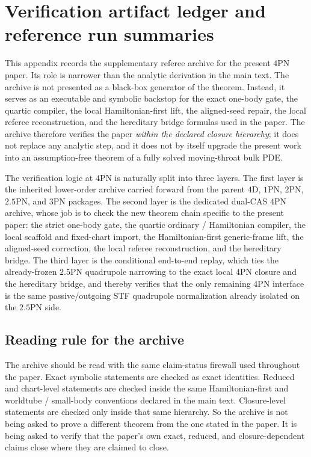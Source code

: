 \documentclass[11pt]{article}
\begin{document}

\section{Verification artifact ledger and reference run summaries}
\label{app:verification-artifact-ledger}

This appendix records the supplementary referee archive for the present $4$PN
paper.  Its role is narrower than the analytic derivation in the main text.  The
archive is not presented as a black-box generator of the theorem.  Instead, it
serves as an executable and symbolic backstop for the exact one-body gate, the
quartic compiler, the local Hamiltonian-first lift, the aligned-seed repair, the
local referee reconstruction, and the hereditary bridge formulas used in the
paper.  The archive therefore verifies the paper \emph{within the declared
closure hierarchy}; it does not replace any analytic step, and it does not by
itself upgrade the present work into an assumption-free theorem of a fully solved
moving-throat bulk PDE.

The verification logic at $4$PN is naturally split into three layers.  The
first layer is the inherited lower-order archive carried forward from the parent
$4$D, $1$PN, $2$PN, $2.5$PN, and $3$PN packages.  The second layer is the
dedicated dual-CAS $4$PN archive, whose job is to check the new theorem chain
specific to the present paper: the strict one-body gate, the quartic ordinary /
Hamiltonian compiler, the local scaffold and fixed-chart import, the
Hamiltonian-first generic-frame lift, the aligned-seed correction, the local
referee reconstruction, and the hereditary bridge.  The third layer is the
conditional end-to-end replay, which ties the already-frozen $2.5$PN quadrupole
narrowing to the exact local $4$PN closure and the hereditary bridge, and
thereby verifies that the only remaining $4$PN interface is the same
passive/outgoing STF quadrupole normalization already isolated on the $2.5$PN
side.

\subsection{Reading rule for the archive}
\label{app:verification-reading-rule}

The archive should be read with the same claim-status firewall used throughout
the paper.  Exact symbolic statements are checked as exact identities.  Reduced
and chart-level statements are checked inside the same Hamiltonian-first and
worldtube / small-body conventions declared in the main text.  Closure-level
statements are checked only inside that same hierarchy.  So the archive is not
being asked to prove a different theorem from the one stated in the paper.  It
is being asked to verify that the paper's own exact, reduced, and
closure-dependent claims close where they are claimed to close.
\end{document}
